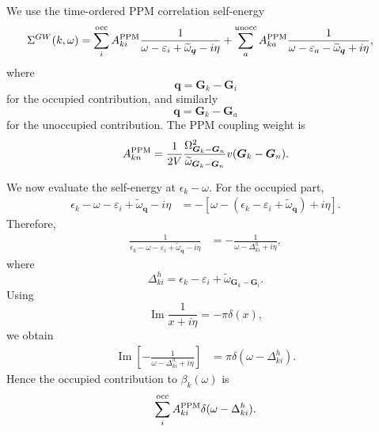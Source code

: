 We use the time-ordered PPM correlation self-energy
\begin{align}
\Sigma^{GW}(k,\omega)
&=
\sum_i^{\rm occ}
A_{ki}^{\rm PPM}
\frac{1}{\omega-\varepsilon_i+\widetilde{\omega}_{\bm q}-i\eta}
+
\sum_a^{\rm unocc}
A_{ka}^{\rm PPM}
\frac{1}{\omega-\varepsilon_a-\widetilde{\omega}_{\bm q}+i\eta},
\end{align}
where
\begin{equation}
    \bm q = \bm G_k-\bm G_i
\end{equation}
for the occupied contribution, and similarly
\begin{equation}
    \bm q = \bm G_k-\bm G_a
\end{equation}
for the unoccupied contribution. The PPM coupling weight is
\begin{equation}
    A_{kn}^{\rm PPM}
    =
    \frac{1}{2V}
    \frac{\Omega_{\bm G_k-\bm G_n}^2}
         {\widetilde{\omega}_{\bm G_k-\bm G_n}}
    v(\bm G_k-\bm G_n).
\end{equation}

We now evaluate the self-energy at \(\epsilon_k-\omega\). For the occupied part,
\begin{align}
\epsilon_k-\omega-\varepsilon_i+\widetilde{\omega}_{\bm q}-i\eta
&=
-\left[
\omega-
\left(
\epsilon_k-\varepsilon_i+\widetilde{\omega}_{\bm q}
\right)
+i\eta
\right].
\end{align}
Therefore,
\begin{align}
\frac{1}
{\epsilon_k-\omega-\varepsilon_i+\widetilde{\omega}_{\bm q}-i\eta}
&=
-\frac{1}
{\omega-\Delta_{ki}^{h}+i\eta},
\end{align}
where
\begin{equation}
    \Delta_{ki}^{h}
    =
    \epsilon_k-\varepsilon_i+\widetilde{\omega}_{\bm G_k-\bm G_i}.
\end{equation}
Using
\begin{equation}
    \operatorname{Im}
    \frac{1}{x+i\eta}
    =
    -\pi\delta(x),
\end{equation}
we obtain
\begin{align}
\operatorname{Im}
\left[
-\frac{1}{\omega-\Delta_{ki}^{h}+i\eta}
\right]
&=
\pi\delta(\omega-\Delta_{ki}^{h}).
\end{align}
Hence the occupied contribution to \(\beta_k(\omega)\) is
\begin{equation}
    \sum_i^{\rm occ}
    A_{ki}^{\rm PPM}
    \delta(\omega-\Delta_{ki}^{h}).
\end{equation}


